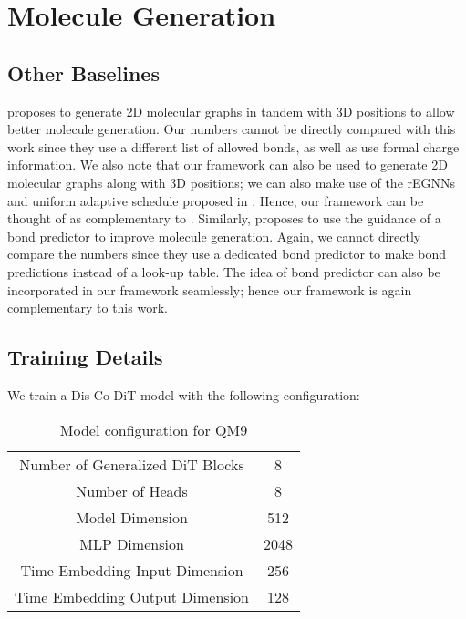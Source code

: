 \section{Molecule Generation}
\label{app:mol_gen}

\subsection{Other Baselines}
\label{app:subsec:baselines}
\cite{vignac2023midi} proposes to generate 2D molecular graphs in tandem with 3D positions to allow better molecule generation. Our numbers cannot be directly compared with this work since they use a different list of allowed bonds, as well as use formal charge information. We also note that our framework can also be used to generate 2D molecular graphs along with 3D positions; we can also make use of the rEGNNs and uniform adaptive schedule proposed in \cite{vignac2023midi}. Hence, our framework can be thought of as complementary to \cite{vignac2023midi}. Similarly, \cite{peng2023moldiff} proposes to use the guidance of a bond predictor to improve molecule generation. Again, we cannot directly compare the numbers since they use a dedicated bond predictor to make bond predictions instead of a look-up table. The idea of bond predictor can also be incorporated in our framework seamlessly; hence our framework is again complementary to this work.

\subsection{Training Details}
\label{app:mol_train_details}

We train a Dis-Co DiT model with the following configuration:

\begin{table}[h]
    \centering
    \begin{tabular}{c c}
    \toprule
   Number of Generalized DiT Blocks  & 8  \\
   Number of Heads  & 8 \\
   Model Dimension & 512 \\
   MLP Dimension & 2048 \\
   Time Embedding Input Dimension & 256 \\
   Time Embedding Output Dimension & 128 \\
   \bottomrule
\end{tabular}
    \caption{Model configuration for QM9}
    \label{tab:qm9_arch}
\end{table}


